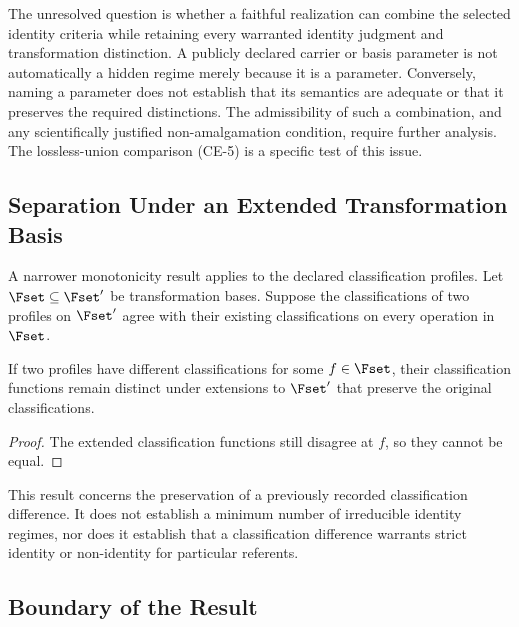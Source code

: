 The unresolved question is whether a faithful realization can combine
the selected identity criteria while retaining every warranted
identity judgment and transformation distinction.
A publicly declared carrier or basis parameter is not automatically
a hidden regime merely because it is a parameter.
Conversely, naming a parameter does not establish that its semantics
are adequate or that it preserves the required distinctions.
The admissibility of such a combination, and any scientifically
justified non-amalgamation condition, require further analysis.
The lossless-union comparison (CE-5) is a specific test of this issue.

\subsection{Separation Under an Extended Transformation Basis}
\label{subsec:monotonicity}

A narrower monotonicity result applies to the declared
classification profiles.
Let $\Fset\subseteq\Fset'$ be transformation bases.
Suppose the classifications of two profiles on $\Fset'$ agree
with their existing classifications on every operation in $\Fset$.

\begin{proposition}
\label{se200.prop.ClassificationDistinctionPersists}
If two profiles have different classifications for some
$f\in\Fset$, their classification functions remain distinct
under extensions to $\Fset'$ that preserve the original classifications.
\end{proposition}

\begin{proof}
The extended classification functions still disagree at $f$,
so they cannot be equal.
\end{proof}

This result concerns the preservation of a previously recorded
classification difference.
It does not establish a minimum number of irreducible identity
regimes, nor does it establish that a classification difference
warrants strict identity or non-identity for particular referents.

\subsection{Boundary of the Result}
\label{subsec:bound_not_claim}


